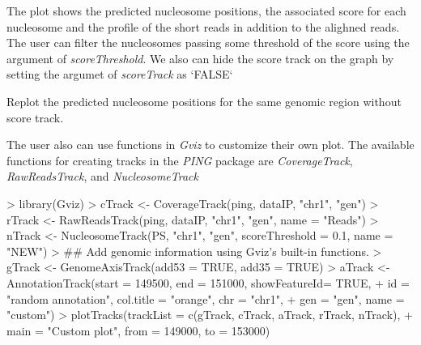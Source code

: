 \documentclass[12pt]{article}
\newcommand{\Rfunction}[1]{{\textit{#1}}}
\newcommand{\Rclass}[1]{{\textit{#1}}}
\begin{document}
The plot shows the predicted nucleosome positions, the associated score for each nucleosome and the profile of the short reads in addition to the alighned reads. The user can filter the nucleosomes passing some threshold of the score using the argument of \Rclass{scoreThreshold}. We also can hide the score track on the graph by setting the argumet of \Rclass{scoreTrack} as `FALSE`

\begin{Exercise}
Replot the predicted nucleosome positions for the same genomic region without score track.
\end{Exercise}


The user also can use functions in \Rclass{Gviz} to customize their own plot. The available functions for creating tracks in the \Rclass{PING} package are \Rfunction{CoverageTrack}, \Rfunction{RawReadsTrack}, and \Rfunction{NucleosomeTrack}

\begin{Schunk}
\begin{Sinput}
> library(Gviz)
> cTrack <- CoverageTrack(ping, dataIP, "chr1", "gen")
> rTrack <- RawReadsTrack(ping, dataIP, "chr1", "gen", name = "Reads")
> nTrack <- NucleosomeTrack(PS, "chr1", "gen", scoreThreshold = 0.1, name = "NEW")
> ## Add genomic information using Gviz's built-in functions. 
> gTrack <- GenomeAxisTrack(add53 = TRUE, add35 = TRUE)
> aTrack <- AnnotationTrack(start = 149500, end = 151000, showFeatureId= TRUE,
+      id = "random annotation", col.title = "orange", chr = "chr1",
+      gen = "gen", name = "custom")
> plotTracks(trackList = c(gTrack, cTrack, aTrack, rTrack, nTrack),
+      main = "Custom plot", from = 149000, to = 153000)
\end{Sinput}
\end{Schunk}
\end{document}
